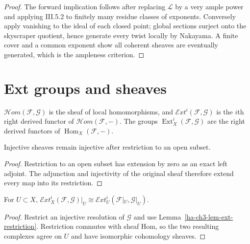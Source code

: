 \begin{proof}

The forward implication follows after replacing $\mathcal L$ by a very ample
power and applying III.5.2 to finitely many residue classes of exponents.
Conversely apply vanishing to the ideal of each closed point; global sections
surject onto the skyscraper quotient, hence generate every twist locally by
Nakayama.  A finite cover and a common exponent show all coherent sheaves
are eventually generated, which is the ampleness criterion.

\end{proof}

\section{Ext groups and sheaves}
\label{ha-ch3-sec6}
\begin{definition}[Ext]
\label{ha-ch3-def-ext}
$\mathcal H om(\mathcal F,\mathcal G)$ is the sheaf of local homomorphisms,
and $\mathcal E xt^i(\mathcal F,\mathcal G)$ is the $i$th right derived
functor of $\mathcal H om(\mathcal F,-)$.  The groups
$\operatorname{Ext}^i_X(\mathcal F,\mathcal G)$ are the right derived
functors of $\operatorname{Hom}_X(\mathcal F,-)$.
\end{definition}
\begin{lemma}\label{ha-ch3-lem-ext-restriction}
Injective sheaves remain injective after restriction to an open subset.

\end{lemma}
\begin{proof}

Restriction to an open subset has extension by zero as an exact left adjoint.  The adjunction and
injectivity of the original sheaf therefore extend every map into its restriction.

\end{proof}
\begin{proposition}\label{ha-ch3-prop-ext-restriction}
For $U\subset X$, $\mathcal E xt_X^i(\mathcal F,\mathcal G)|_U\cong
\mathcal E xt_U^i(\mathcal F|_U,\mathcal G|_U)$.
\end{proposition}
\begin{proof}

Restrict an injective resolution of $\mathcal G$ and use Lemma~\ref{ha-ch3-lem-ext-restriction}.
Restriction commutes with sheaf Hom, so the two resulting complexes agree on $U$ and have isomorphic
cohomology sheaves.

\end{proof}
